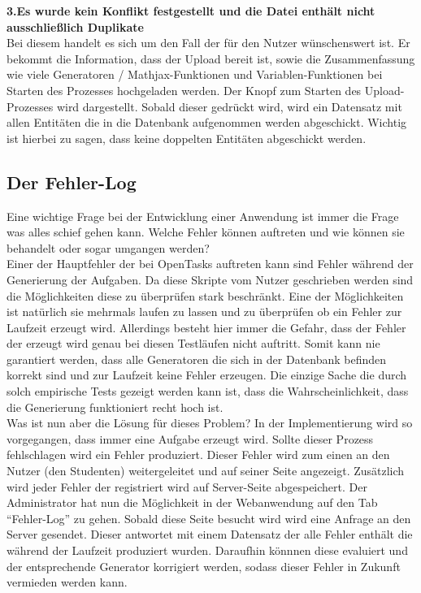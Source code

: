 \noindent \textbf{3.Es wurde kein Konflikt festgestellt und die Datei enthält nicht ausschließlich Duplikate} \\
Bei diesem handelt es sich um den Fall der für den Nutzer wünschenswert ist. Er bekommt die Information, dass der Upload bereit ist, sowie die Zusammenfassung wie viele Generatoren / Mathjax-Funktionen und Variablen-Funktionen bei Starten des Prozesses hochgeladen werden. Der Knopf zum Starten des Upload-Prozesses wird dargestellt. Sobald dieser gedrückt wird, wird ein Datensatz mit allen Entitäten die in die Datenbank aufgenommen werden abgeschickt. Wichtig ist hierbei zu sagen, dass keine doppelten Entitäten abgeschickt werden.\\



\subsection{Der Fehler-Log}

Eine wichtige Frage bei der Entwicklung einer Anwendung ist immer die Frage was alles schief gehen kann. Welche Fehler können auftreten und wie können sie behandelt oder sogar umgangen werden? \\
Einer der Hauptfehler der bei OpenTasks auftreten kann sind Fehler während der Generierung der Aufgaben. Da diese Skripte vom Nutzer geschrieben werden sind die Möglichkeiten diese zu überprüfen stark beschränkt. Eine der Möglichkeiten ist natürlich sie mehrmals laufen zu lassen und zu überprüfen ob ein Fehler zur Laufzeit erzeugt wird. Allerdings besteht hier immer die Gefahr, dass der Fehler der erzeugt wird genau bei diesen Testläufen nicht auftritt. Somit kann nie garantiert werden, dass alle Generatoren die sich in der Datenbank befinden korrekt sind und zur Laufzeit keine Fehler erzeugen. Die einzige Sache die durch solch empirische Tests gezeigt werden kann ist, dass die Wahrscheinlichkeit, dass die Generierung funktioniert recht hoch ist. \\

Was ist nun aber die Lösung für dieses Problem? In der Implementierung wird so vorgegangen, dass immer eine Aufgabe erzeugt wird. Sollte dieser Prozess fehlschlagen wird ein Fehler produziert. Dieser Fehler wird zum einen an den Nutzer (den Studenten) weitergeleitet und auf seiner Seite angezeigt. Zusätzlich wird jeder Fehler der registriert wird auf Server-Seite abgespeichert. Der Administrator hat nun die Möglichkeit in der Webanwendung auf den Tab ``Fehler-Log'' zu gehen. Sobald diese Seite besucht wird wird eine Anfrage an den Server gesendet. Dieser antwortet mit einem Datensatz der alle Fehler enthält die während der Laufzeit produziert wurden. Daraufhin könnnen diese evaluiert und der entsprechende Generator korrigiert werden, sodass dieser Fehler in Zukunft vermieden werden kann. \\

